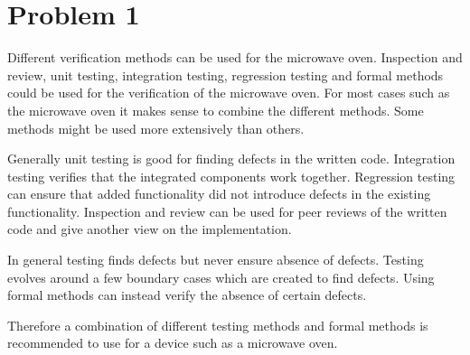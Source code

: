 \chapter{Problem 1}
\label{chp:one}


Different verification methods can be used for the microwave oven. Inspection and review, unit testing, integration testing, regression testing and formal methods could be used for the verification of the microwave oven. For most cases such as the microwave oven it makes sense to combine the different methods. Some methods might be used more extensively than others. 

Generally unit testing is good for finding defects in the written code. Integration testing verifies that the integrated components work together. Regression testing can ensure that added functionality did not introduce defects in the existing functionality. Inspection and review can be used for peer reviews of the written code and give another view on the implementation.

In general testing finds defects but never ensure absence of defects. Testing evolves around a few boundary cases which are created to find defects. Using formal methods can instead verify the absence of certain defects. 

Therefore a combination of different testing methods and formal methods is recommended to use for a device such as a microwave oven. 


